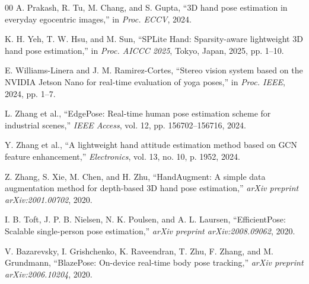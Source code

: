 \documentclass[10pt,letterpaper]{article}
\begin{document}
\begin{thebibliography}{00}
A. Prakash, R. Tu, M. Chang, and S. Gupta, ``3D hand pose estimation in everyday egocentric images,'' in \emph{Proc. ECCV}, 2024.

K. H. Yeh, T. W. Hsu, and M. Sun, ``SPLite Hand: Sparsity-aware lightweight 3D hand pose estimation,'' in \emph{Proc. AICCC 2025}, Tokyo, Japan, 2025, pp. 1--10.

E. Williams-Linera and J. M. Ramirez-Cortes, ``Stereo vision system based on the NVIDIA Jetson Nano for real-time evaluation of yoga poses,'' in \emph{Proc. IEEE}, 2024, pp. 1--7.

L. Zhang et al., ``EdgePose: Real-time human pose estimation scheme for industrial scenes,'' \emph{IEEE Access}, vol. 12, pp. 156702--156716, 2024.

Y. Zhang et al., ``A lightweight hand attitude estimation method based on GCN feature enhancement,'' \emph{Electronics}, vol. 13, no. 10, p. 1952, 2024.

Z. Zhang, S. Xie, M. Chen, and H. Zhu, ``HandAugment: A simple data augmentation method for depth-based 3D hand pose estimation,'' \emph{arXiv preprint arXiv:2001.00702}, 2020.

I. B. Toft, J. P. B. Nielsen, N. K. Poulsen, and A. L. Laursen, ``EfficientPose: Scalable single-person pose estimation,'' \emph{arXiv preprint arXiv:2008.09062}, 2020.

V. Bazarevsky, I. Grishchenko, K. Raveendran, T. Zhu, F. Zhang, and M. Grundmann, ``BlazePose: On-device real-time body pose tracking,'' \emph{arXiv preprint arXiv:2006.10204}, 2020.

\end{thebibliography}
\end{document}
